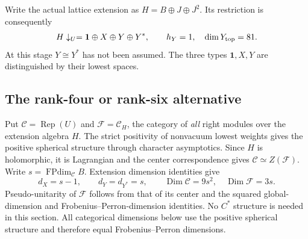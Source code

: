 Write the actual lattice extension as $H=B\oplus J\oplus J^2$. Its
restriction is consequently
\begin{equation}
 H\downarrow_U=\mathbf1\oplus X\oplus Y\oplus Y^*,\qquad
 h_Y=1,\quad\dim Y_{\rm top}=81.
 \label{eq:H-branching-fork}
\end{equation}
At this stage $Y\cong Y^*$ has not been assumed. The three types
$\mathbf1,X,Y$ are distinguished by their lowest spaces.

\subsection{The rank-four or rank-six alternative}

Put $\mathcal C=\operatorname{Rep}(U)$ and
$\mathcal F=\mathcal C_H$, the category of \emph{all} right modules
over the extension algebra $H$. The strict positivity of nonvacuum
lowest weights gives the positive spherical structure through character
asymptotics. Since $H$ is holomorphic, it is Lagrangian and the
center correspondence \cite[Section~4]{DMNO}
gives $\mathcal C\simeq Z(\mathcal F)$.
Write $s=\operatorname{FPdim}_{\mathcal C}B$. Extension dimension
identities give
\[
 d_X=s-1,\qquad d_Y=d_{Y^*}=s,\qquad
 \operatorname{Dim}\mathcal C=9s^2,\quad
 \operatorname{Dim}\mathcal F=3s.
\]
Pseudo-unitarity of $\mathcal F$ follows from that of its center and
the squared global-dimension and Frobenius--Perron-dimension identities.
No $C^*$ structure is needed in this section. All categorical dimensions
below use the positive spherical structure and therefore equal
Frobenius--Perron dimensions.

